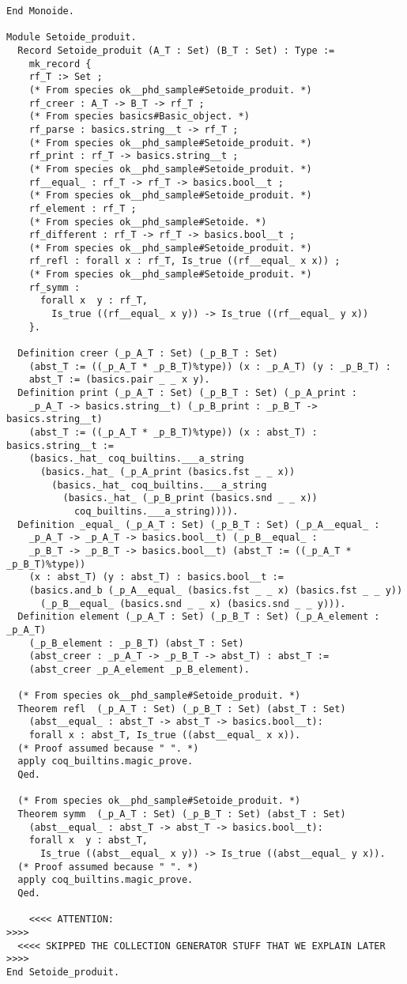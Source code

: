 {\begin{lstlisting}[language=MyCoq]
End Monoide.

Module Setoide_produit.
  Record Setoide_produit (A_T : Set) (B_T : Set) : Type :=
    mk_record {
    rf_T :> Set ;
    (* From species ok__phd_sample#Setoide_produit. *)
    rf_creer : A_T -> B_T -> rf_T ;
    (* From species basics#Basic_object. *)
    rf_parse : basics.string__t -> rf_T ;
    (* From species ok__phd_sample#Setoide_produit. *)
    rf_print : rf_T -> basics.string__t ;
    (* From species ok__phd_sample#Setoide_produit. *)
    rf__equal_ : rf_T -> rf_T -> basics.bool__t ;
    (* From species ok__phd_sample#Setoide_produit. *)
    rf_element : rf_T ;
    (* From species ok__phd_sample#Setoide. *)
    rf_different : rf_T -> rf_T -> basics.bool__t ;
    (* From species ok__phd_sample#Setoide_produit. *)
    rf_refl : forall x : rf_T, Is_true ((rf__equal_ x x)) ;
    (* From species ok__phd_sample#Setoide_produit. *)
    rf_symm :
      forall x  y : rf_T,
        Is_true ((rf__equal_ x y)) -> Is_true ((rf__equal_ y x))
    }.
  
  Definition creer (_p_A_T : Set) (_p_B_T : Set)
    (abst_T := ((_p_A_T * _p_B_T)%type)) (x : _p_A_T) (y : _p_B_T) :
    abst_T := (basics.pair _ _ x y).
  Definition print (_p_A_T : Set) (_p_B_T : Set) (_p_A_print :
    _p_A_T -> basics.string__t) (_p_B_print : _p_B_T -> basics.string__t)
    (abst_T := ((_p_A_T * _p_B_T)%type)) (x : abst_T) : basics.string__t :=
    (basics._hat_ coq_builtins.___a_string
      (basics._hat_ (_p_A_print (basics.fst _ _ x))
        (basics._hat_ coq_builtins.___a_string
          (basics._hat_ (_p_B_print (basics.snd _ _ x))
            coq_builtins.___a_string)))).
  Definition _equal_ (_p_A_T : Set) (_p_B_T : Set) (_p_A__equal_ :
    _p_A_T -> _p_A_T -> basics.bool__t) (_p_B__equal_ :
    _p_B_T -> _p_B_T -> basics.bool__t) (abst_T := ((_p_A_T * _p_B_T)%type))
    (x : abst_T) (y : abst_T) : basics.bool__t :=
    (basics.and_b (_p_A__equal_ (basics.fst _ _ x) (basics.fst _ _ y))
      (_p_B__equal_ (basics.snd _ _ x) (basics.snd _ _ y))).
  Definition element (_p_A_T : Set) (_p_B_T : Set) (_p_A_element : _p_A_T)
    (_p_B_element : _p_B_T) (abst_T : Set)
    (abst_creer : _p_A_T -> _p_B_T -> abst_T) : abst_T :=
    (abst_creer _p_A_element _p_B_element).
  
  (* From species ok__phd_sample#Setoide_produit. *)
  Theorem refl  (_p_A_T : Set) (_p_B_T : Set) (abst_T : Set)
    (abst__equal_ : abst_T -> abst_T -> basics.bool__t):
    forall x : abst_T, Is_true ((abst__equal_ x x)).
  (* Proof assumed because " ". *)
  apply coq_builtins.magic_prove.
  Qed.
  
  (* From species ok__phd_sample#Setoide_produit. *)
  Theorem symm  (_p_A_T : Set) (_p_B_T : Set) (abst_T : Set)
    (abst__equal_ : abst_T -> abst_T -> basics.bool__t):
    forall x  y : abst_T,
      Is_true ((abst__equal_ x y)) -> Is_true ((abst__equal_ y x)).
  (* Proof assumed because " ". *)
  apply coq_builtins.magic_prove.
  Qed.
  
    <<<< ATTENTION:                                                   >>>>
  <<<< SKIPPED THE COLLECTION GENERATOR STUFF THAT WE EXPLAIN LATER >>>>
End Setoide_produit.
\end{lstlisting}}



